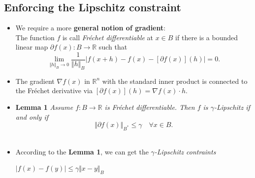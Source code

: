 \documentclass[landscape,headrule,footrule]{foils}
\begin{document}
\subsection{Enforcing the Lipschitz constraint}
\tableofcontents
\begin{frame}
\begin{flushleft}
\begin{itemize}
\item We require a more \textbf{general notion of gradient}: \\
The function $f$ is call \textit{Fréchet differentiable} at $x \in B$ if there is a bounded linear map $\partial f(x) :B \rightarrow \mathbb{R}$ such that
\begin{equation}
\mathop{\lim}_{\Vert h \Vert_B \rightarrow 0} \dfrac{1}{\Vert h \Vert_B} |f(x+h) - f(x) - [\partial f(x)] (h)| = 0.
\end{equation}
\item The gradient $\nabla f(x)$ in $\mathbb{R}^n$ with the standard inner product is connected to  the Fréchet derivative via $[\partial f(x)](h) = \nabla f(x) \cdot h$.
\\
\end{itemize}
\end{flushleft}
\end{frame}

\begin{frame}
\begin{flushleft}
\begin{itemize}
\item \textbf{Lemma 1}
\textit{Assume $f:B \rightarrow \mathbb{R}$ is Fréchet differentiable. Then $f$ is $\gamma$-Lipschitz if and only if} \\
\begin{equation}
\Vert \partial f(x) \Vert_{B^*} \leq \gamma \quad \forall x \in B.
\end{equation}
 \\
\item According to the \textbf{Lemma 1}, we can get the \textit{$\gamma$-Lipschitz contraints} \\
\begin{center}
$|f(x) - f(y)| \leq \gamma \Vert x-y \Vert_B$ \\
\end{center}
\end{itemize}
\end{flushleft}
\end{frame}
\end{document}
